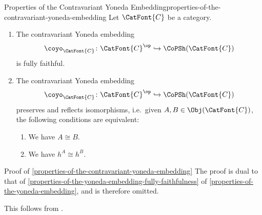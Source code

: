 \begin{proposition}{Properties of the Contravariant Yoneda Embedding}{properties-of-the-contravariant-yoneda-embedding}%
    Let $\CatFont{C}$ be a category.
    \begin{enumerate}
        \item\label{properties-of-the-contravariant-yoneda-embedding-fully-faithfulness}The contravariant Yoneda embedding
            \[
                \coyo_{\CatFont{C}}%
                \colon%
                \CatFont{C}^{\op}%
                \hookrightarrow%
                \CoPSh(\CatFont{C})%
            \]%
            is fully faithful.
        \item\label{properties-of-the-contravariant-yoneda-embedding-preservation-and-reflection-of-isomorphisms}The contravariant Yoneda embedding
            \[
                \coyo_{\CatFont{C}}%
                \colon%
                \CatFont{C}^{\op}%
                \hookrightarrow%
                \CoPSh(\CatFont{C})%
            \]%
            preserves and reflects isomorphisms, i.e.\ given $A,B\in\Obj(\CatFont{C})$, the following conditions are equivalent:
            \begin{enumerate}
                \item We have $A\cong B$.
                \item We have $h^{A}\cong h^{B}$.
            \end{enumerate}
    \end{enumerate}
\end{proposition}
\begin{Proof}{Proof of \cref{properties-of-the-contravariant-yoneda-embedding}}%
    The proof is dual to that of \cref{properties-of-the-yoneda-embedding-fully-faithfulness} of \cref{properties-of-the-yoneda-embedding}, and is therefore omitted.

    This follows from .
\end{Proof}
